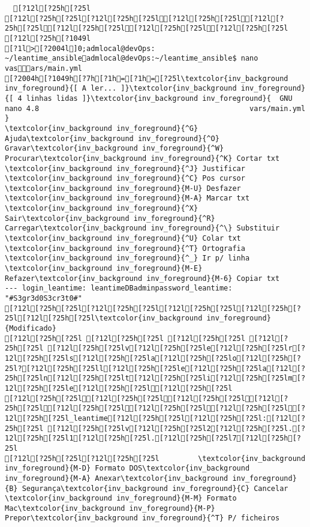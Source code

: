 \documentclass{scrartcl}
\begin{document}
\begin{Verbatim}
  [?12l[?25h[?25l
[?12l[?25h[?25l[?12l[?25h[?25l[?12l[?25h[?25l[?12l[?25h[?25l[?12l[?25h[?25l[?12l[?25h[?25l[?12l[?25h[?25l
[?12l[?25h[?1049l
[?1l>[?2004l]0;admlocal@devOps: ~/leantime_ansibleadmlocal@devOps:~/leantime_ansible$ nano vasars/main.yml 
[?2004h[?1049h[?7h[?1h=[?1h=[?25l\textcolor{inv_background inv_foreground}{[ A ler... ]}\textcolor{inv_background inv_foreground}{[ 4 linhas lidas ]}\textcolor{inv_background inv_foreground}{  GNU nano 4.8                                                 vars/main.yml                                                              }
\textcolor{inv_background inv_foreground}{^G} Ajuda\textcolor{inv_background inv_foreground}{^O} Gravar\textcolor{inv_background inv_foreground}{^W} Procurar\textcolor{inv_background inv_foreground}{^K} Cortar txt    \textcolor{inv_background inv_foreground}{^J} Justificar    \textcolor{inv_background inv_foreground}{^C} Pos cursor    \textcolor{inv_background inv_foreground}{M-U} Desfazer     \textcolor{inv_background inv_foreground}{M-A} Marcar txt
\textcolor{inv_background inv_foreground}{^X} Sair\textcolor{inv_background inv_foreground}{^R} Carregar\textcolor{inv_background inv_foreground}{^\} Substituir    \textcolor{inv_background inv_foreground}{^U} Colar txt     \textcolor{inv_background inv_foreground}{^T} Ortografia    \textcolor{inv_background inv_foreground}{^_} Ir p/ linha   \textcolor{inv_background inv_foreground}{M-E} Refazer\textcolor{inv_background inv_foreground}{M-6} Copiar txt
--- login_leantime: leantimeDBadminpassword_leantime: "#S3gr3d0S3cr3t0#"
[?12l[?25h[?25l[?12l[?25h[?25l[?12l[?25h[?25l[?12l[?25h[?25l[?12l[?25h[?25l\textcolor{inv_background inv_foreground}{Modificado}
[?12l[?25h[?25l [?12l[?25h[?25l [?12l[?25h[?25l [?12l[?25h[?25l [?12l[?25h[?25lv[?12l[?25h[?25le[?12l[?25h[?25lr[?12l[?25h[?25ls[?12l[?25h[?25la[?12l[?25h[?25lo[?12l[?25h[?25l?[?12l[?25h[?25ll[?12l[?25h[?25le[?12l[?25h[?25la[?12l[?25h[?25ln[?12l[?25h[?25lt[?12l[?25h[?25li[?12l[?25h[?25lm[?12l[?25h[?25le[?12l[?25h[?25l[?12l[?25h[?25l
[?12l[?25h[?25l[?12l[?25h[?25l[?12l[?25h[?25l[?12l[?25h[?25l[?12l[?25h[?25l[?12l[?25h[?25l[?12l[?25h[?25l[?12l[?25h[?25l_leantime[?12l[?25h[?25l[?12l[?25h[?25l:[?12l[?25h[?25l [?12l[?25h[?25lv[?12l[?25h[?25l2[?12l[?25h[?25l.[?12l[?25h[?25l1[?12l[?25h[?25l.[?12l[?25h[?25l7[?12l[?25h[?25l
[?12l[?25h[?25l[?12l[?25h[?25l         \textcolor{inv_background inv_foreground}{M-D} Formato DOS\textcolor{inv_background inv_foreground}{M-A} Anexar\textcolor{inv_background inv_foreground}{B} Segurança\textcolor{inv_background inv_foreground}{C} Cancelar           \textcolor{inv_background inv_foreground}{M-M} Formato Mac\textcolor{inv_background inv_foreground}{M-P} Prepor\textcolor{inv_background inv_foreground}{^T} P/ ficheiros

\end{Verbatim}
\end{document}
